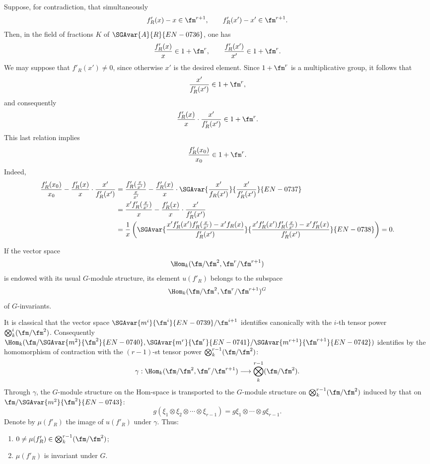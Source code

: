 Suppose, for contradiction, that simultaneously
\[
f'_R(x)-x\in\fm^{r+1},
\qquad
f'_R(x')-x'\in\fm^{r+1}.
\]
Then, in the field of fractions $K$ of $\SGAvar{A}{R}{EN-0736}$, one has
\[
\frac{f'_R(x)}{x}\in1+\fm^r,
\qquad
\frac{f'_R(x')}{x'}\in1+\fm^r.
\]
We may suppose that $f'_R(x')\ne0$, since otherwise $x'$ is the desired
element. Since $1+\fm^r$ is a multiplicative group, it follows that
\[
\frac{x'}{f'_R(x')}\in1+\fm^r,
\]
and consequently
\[
\frac{f'_R(x)}{x}\cdot\frac{x'}{f'_R(x')}\in1+\fm^r.
\]
This last relation implies
\[
\frac{f'_R(x_0)}{x_0}\in1+\fm^r.
\]
Indeed,
\[
\begin{aligned}
\frac{f'_R(x_0)}{x_0}
-\frac{f'_R(x)}{x}\cdot\frac{x'}{f'_R(x')}
&=\frac{f'_R(\frac{x}{x'})}{\frac{x}{x'}}
-\frac{f'_R(x)}{x}\cdot\SGAvar{\frac{x'}{f_R(x')}}{\frac{x'}{f'_R(x')}}{EN-0737}\\
&=\frac{x'f'_R(\frac{x}{x'})}{x}
-\frac{f'_R(x)}{x}\cdot\frac{x'}{f'_R(x')}\\
&=\frac1x\left(
\SGAvar{\frac{x'f'_R(x')f'_R(\frac{x}{x'})-x'f_R(x)}
{f'_R(x')}}{\frac{x'f'_R(x')f'_R(\frac{x}{x'})-x'f'_R(x)}
{f'_R(x')}}{EN-0738}\right)=0.
\end{aligned}
\]

If the vector space
\[
\Hom_k(\fm/\fm^2,\fm^r/\fm^{r+1})
\]
is endowed with its usual $G$-module structure, its element $u(f'_R)$
belongs to the subspace
\[
\Hom_k(\fm/\fm^2,\fm^r/\fm^{r+1})^G
\]
of $G$-invariants.

It is classical that the vector space $\SGAvar{m^i}{\fm^i}{EN-0739}/\fm^{i+1}$ identifies
canonically with the $i$-th tensor power
$\bigotimes_k^i(\fm/\fm^2)$. Consequently
$\Hom_k(\fm/\SGAvar{m^2}{\fm^2}{EN-0740},\SGAvar{m^r}{\fm^r}{EN-0741}/\SGAvar{m^{r+1}}{\fm^{r+1}}{EN-0742})$ identifies by the homomorphism of
contraction with the $(r-1)$-st tensor power
$\bigotimes_k^{r-1}(\fm/\fm^2)$:
\[
\gamma:\Hom_k(\fm/\fm^2,\fm^r/\fm^{r+1})
\longrightarrow\bigotimes_k^{r-1}(\fm/\fm^2).
\]
Through $\gamma$, the $G$-module structure on the Hom-space is
transported to the $G$-module structure on
$\bigotimes_k^{r-1}(\fm/\fm^2)$ induced by that on $\fm/\SGAvar{m^2}{\fm^2}{EN-0743}$:
\[
g(\xi_1\otimes\xi_2\otimes\cdots\otimes\xi_{r-1})
=g\xi_1\otimes\cdots\otimes g\xi_{r-1}.
\]
Denote by $\mu(f'_R)$ the image of $u(f'_R)$ under $\gamma$. Thus:
\begin{enumerate}
\item[I)] $0\ne\mu(f'_R)\in\bigotimes_k^{r-1}(\fm/\fm^2)$;
\item[II)] $\mu(f'_R)$ is invariant under $G$.
\end{enumerate}


